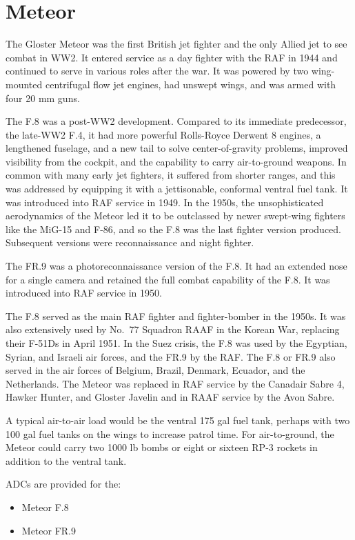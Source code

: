 \section*{Meteor}

The Gloster Meteor was the first British jet fighter and the only Allied jet to see combat in WW2. It entered service as a day fighter with the RAF in 1944 and continued to serve in various roles after the war. It was powered by two wing-mounted centrifugal flow jet engines, had unswept wings, and was armed with four 20 mm guns.

The F.8 was a post-WW2 development. Compared to its immediate predecessor, the late-WW2 F.4, it had more powerful Rolls-Royce Derwent 8 engines, a lengthened fuselage, and a new tail to solve center-of-gravity problems, improved visibility from the cockpit, and the capability to carry air-to-ground weapons. In common with many early jet fighters, it suffered from shorter ranges, and this was addressed by equipping it with a jettisonable, conformal ventral fuel tank. It was introduced into RAF service in 1949. In the 1950s, the unsophisticated aerodynamics of the Meteor led it to be outclassed by newer swept-wing fighters like the MiG-15 and F-86, and so the F.8 was the last fighter version produced. Subsequent versions were reconnaissance and night fighter.
 
The FR.9 was a photoreconnaissance version of the F.8. It had an extended nose for a single camera and retained the full combat capability of the F.8. It was introduced into RAF service in 1950.

The F.8 served as the main RAF fighter and fighter-bomber in the 1950s. It was also extensively used by No.~77 Squadron RAAF in the Korean War, replacing their F-51Ds in April 1951. In the Suez crisis, the F.8 was used by the Egyptian, Syrian, and Israeli air forces, and the FR.9 by the RAF. The F.8 or FR.9 also served in the air forces of Belgium, Brazil, Denmark, Ecuador, and the Netherlands. The Meteor was replaced in RAF service by the Canadair Sabre 4, Hawker Hunter, and Gloster Javelin and in RAAF service by the Avon Sabre.


A typical air-to-air load would be the ventral 175 gal fuel tank, perhaps with two 100 gal fuel tanks on the wings to increase patrol time. For air-to-ground, the Meteor could carry two 1000 lb bombs or eight or sixteen RP-3 rockets in addition to the ventral tank.

ADCs are provided for the:
\begin{itemize}
\item Meteor F.8
\item Meteor FR.9
\end{itemize}

